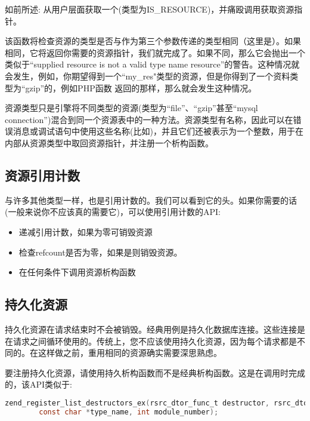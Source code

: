 如前所述: 从用户层面获取一个(类型为IS\_RESOURCE)，并痛殴调用获取资源指针。

该函数将检查资源的类型是否与作为第三个参数传递的类型相同（这里是）。如果相同，它将返回你需要的资源指针，我们就完成了。如果不同，那么它会抛出一个类似于“supplied resource is not a valid {type name} resource”的警告。这种情况就会发生，例如，你期望得到一个“my\_res"类型的资源，但是你得到了一个资料类型为“gzip”的，例如PHP函数 返回的那样，那么就会发生这种情况。

资源类型只是引擎将不同类型的资源(类型为“file”、“gzip”甚至“mysql connection”)混合到同一个资源表中的一种方法。资源类型有名称，因此可以在错误消息或调试语句中使用这些名称(比如)，并且它们还被表示为一个整数，用于在内部从资源类型中取回资源指针，并注册一个析构函数。


\subsection{资源引用计数}

与许多其他类型一样，也是引用计数的。我们可以看到它的头。如果你需要的话(一般来说你不应该真的需要它)，可以使用引用计数的API:

\begin{itemize}
        \item {} 递减引用计数，如果为零可销毁资源
        \item {} 检查refcount是否为零，如果是则销毁资源。
        \item {} 在任何条件下调用资源析构函数
\end{itemize}


\subsection{持久化资源}

持久化资源在请求结束时不会被销毁。经典用例是持久化数据库连接。这些连接是在请求之间循环使用的。传统上，您不应该使用持久化资源，因为每个请求都是不同的。在这样做之前，重用相同的资源确实需要深思熟虑。

要注册持久化资源，请使用持久析构函数而不是经典析构函数。这是在调用时完成的，该API类似于:

\begin{lstlisting}[language=c]
        zend_register_list_destructors_ex(rsrc_dtor_func_t destructor, rsrc_dtor_func_t persistent_destructor,
        const char *type_name, int module_number);     
\end{lstlisting} 




